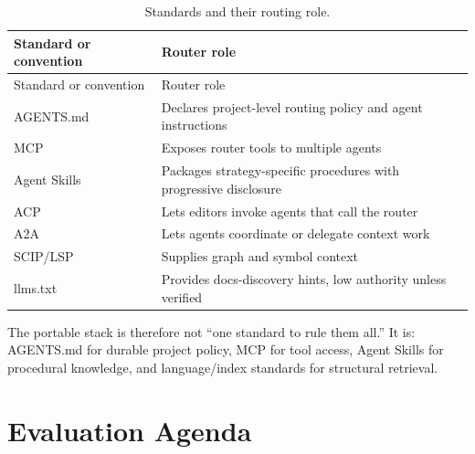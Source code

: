 \documentclass[
  11pt,
  letterpaper,
  numbers=noendperiod,
  parskip=half]{scrartcl}
\begin{document}
\begin{longtable}[]{@{}
  >{\raggedright\arraybackslash}p{}
  >{\raggedright\arraybackslash}p{}@{}}
\caption{Standards and their routing
role.}\label{tbl-standards-role}\tabularnewline
\toprule\noalign{}
\begin{minipage}[b]{\linewidth}\raggedright
Standard or convention
\end{minipage} & \begin{minipage}[b]{\linewidth}\raggedright
Router role
\end{minipage} \\
\midrule\noalign{}
\endfirsthead
\toprule\noalign{}
\begin{minipage}[b]{\linewidth}\raggedright
Standard or convention
\end{minipage} & \begin{minipage}[b]{\linewidth}\raggedright
Router role
\end{minipage} \\
\midrule\noalign{}
\endhead
\bottomrule\noalign{}
\endlastfoot
AGENTS.md & Declares project-level routing policy and agent
instructions \\
MCP & Exposes router tools to multiple agents \\
Agent Skills & Packages strategy-specific procedures with progressive
disclosure \\
ACP & Lets editors invoke agents that call the router \\
A2A & Lets agents coordinate or delegate context work \\
SCIP/LSP & Supplies graph and symbol context \\
llms.txt & Provides docs-discovery hints, low authority unless
verified \\
\end{longtable}

The portable stack is therefore not ``one standard to rule them all.''
It is: AGENTS.md for durable project policy, MCP for tool access, Agent
Skills for procedural knowledge, and language/index standards for
structural retrieval.

\iffalse
\section{Evaluation Agenda}\label{sec-eval}
\end{document}

